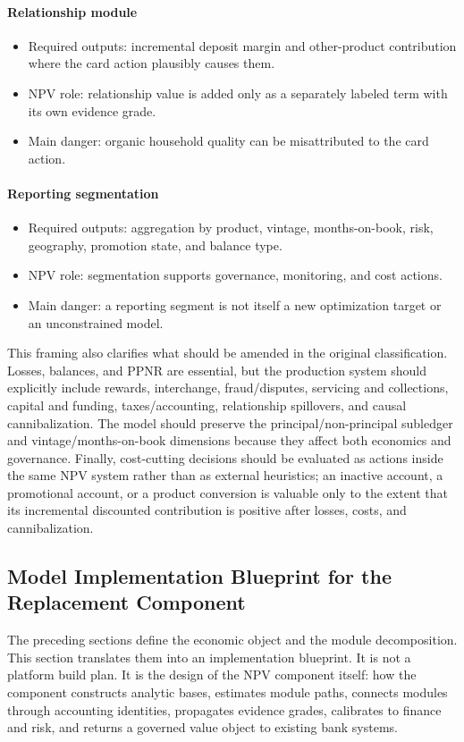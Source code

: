 \documentclass[11pt]{article}
\newcommand{\1}{\mathbf{1}}
\newcommand{\contractitem}[2]{\paragraph{#1}\begin{itemize}[leftmargin=1.5em,itemsep=0.12em,topsep=0.18em]#2\end{itemize}}
\begin{document}
\contractitem{Relationship module}{
  \item Required outputs: incremental deposit margin and other-product
        contribution where the card action plausibly causes them.
  \item NPV role: relationship value is added only as a separately labeled
        term with its own evidence grade.
  \item Main danger: organic household quality can be misattributed to the
        card action.
}
\contractitem{Reporting segmentation}{
  \item Required outputs: aggregation by product, vintage, months-on-book,
        risk, geography, promotion state, and balance type.
  \item NPV role: segmentation supports governance, monitoring, and cost
        actions.
  \item Main danger: a reporting segment is not itself a new optimization
        target or an unconstrained model.
}

This framing also clarifies what should be amended in the original
classification. Losses, balances, and PPNR are essential, but the production
system should explicitly include rewards, interchange, fraud/disputes,
servicing and collections, capital and funding, taxes/accounting, relationship
spillovers, and causal cannibalization. The model should preserve the
principal/non-principal subledger and vintage/months-on-book dimensions because
they affect both economics and governance. Finally, cost-cutting decisions
should be evaluated as actions inside the same NPV system rather than as
external heuristics; an inactive account, a promotional account, or a product
conversion is valuable only to the extent that its incremental discounted
contribution is positive after losses, costs, and cannibalization.

\subsection{Model Implementation Blueprint for the Replacement Component}
\label{sec:model-implementation-blueprint}

The preceding sections define the economic object and the module
decomposition. This section translates them into an implementation blueprint.
It is not a platform build plan. It is the design of the NPV component itself:
how the component constructs analytic bases, estimates module paths, connects
modules through accounting identities, propagates evidence grades, calibrates
to finance and risk, and returns a governed value object to existing bank
systems.
\end{document}
